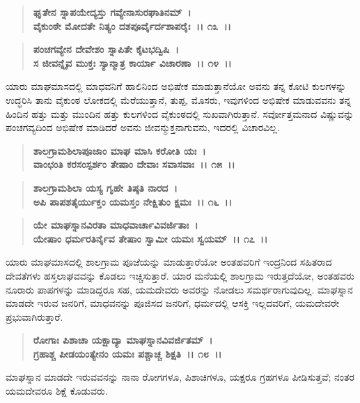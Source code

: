 \begin{verse}
\textbf{ಘೃತೇನ ಸ್ನಾಪಯೇದ್ಯಸ್ತು ಗವ್ಯೇನಾಸುರಘಾತಿನಮ್~।}\\\textbf{ವೈಕುಂಠೇ ಮೋದತೇ ನಿತ್ಯಂ ದಶಪೂರ್ವೈರ್ದಶಾಪರೈಃ~।। ೧೩~।।}
\end{verse}

\begin{verse}
\textbf{ಪಂಚಗವ್ಯೇನ ದೇವೇಶಂ ಸ್ನಾಪಿತೇ ಕೈಟಭದ್ವಿಷಿ~।}\\\textbf{ಸ ಜೀವನ್ನೈವ ಮುಕ್ತಃ ಸ್ಯಾನ್ಮಾತ್ರ ಕಾರ್ಯಾ ವಿಚಾರಣಾ~।। ೧೪~।।}
\end{verse}

ಯಾರು ಮಾಘಮಾಸದಲ್ಲಿ ಮಾಧವನಿಗೆ ಹಾಲಿನಿಂದ ಅಭಿಷೇಕ ಮಾಡುತ್ತಾನೆಯೋ ಅವನು ತನ್ನ ಕೋಟಿ ಕುಲಗಳನ್ನು ಉದ್ಧರಿಸಿ ತಾನು ವೈಕುಂಠ ಲೋಕದಲ್ಲಿ ಮೆರೆಯುತ್ತಾನೆ, ತುಪ್ಪ, ಮೊಸರು, ಇವುಗಳಿಂದ ಅಭಿಷೇಕ ಮಾಡುವವನು ತನ್ನ ಹಿಂದಿನ ಹತ್ತು ಮತ್ತು ಮುಂದಿನ ಹತ್ತು ಕುಲಗಳಿಂದ ವೈಕುಂಠದಲ್ಲಿ ಸುಖವಾಗಿರುತ್ತಾನೆ. ಸರ್ವೋತ್ತಮನಾದ ವಿಷ್ಣುವನ್ನು ಪಂಚಗವ್ಯದಿಂದ ಅಭಿಷೇಕ ಮಾಡಿದರೆ ಅವನು ಜೀವನ್ಮುಕ್ತನಾಗುವನು, ಇದರಲ್ಲಿ ವಿಚಾರವಿಲ್ಲ.

\begin{verse}
\textbf{ಶಾಲಗ್ರಾಮಶಿಲಾಪೂಜಾಂ ಮಾಘ ಮಾಸಿ ಕರೋತಿ ಯಃ~।}\\\textbf{ವಾಂಛಂತಿ ಕರಸಂಸ್ಪರ್ಶಂ ತೇಷಾಂ ದೇವಾಃ ಸವಾಸವಾಃ~।। ೧೫~।। }
\end{verse}

\begin{verse}
\textbf{ಶಾಲಗ್ರಾಮಶಿಲಾ ಯಸ್ಯ ಗೃಹೇ ತಿಷ್ಠತಿ ನಾರದ~।}\\\textbf{ಅಪಿ ಪಾಪಶತೈರ್ಯುಕ್ತಂ ಯಮಸ್ತಂ ನೇಕ್ಷಿತುಂ ಕ್ಷಮಃ~।। ೧೬~।।} 
\end{verse}

\begin{verse}
\textbf{ಯೇ ಮಾಘಸ್ನಾನವಿರತಾ ಮಾಧವಾರ್ಚಾವಿವರ್ಜಿತಾಃ~।}\\\textbf{ಯೇಷಾಂ ಧರ್ಮರತಿರ್ನೈವ ತೇಷಾಂ ಸ್ವಾಮೀ ಯಮಃ ಸ್ವಯಮ್~।। ೧೭~।।}
\end{verse}

ಯಾರು ಮಾಘಮಾಸದಲ್ಲಿ ಶಾಲಗ್ರಾಮ ಪೂಜೆಯನ್ನು ಮಾಡುತ್ತಾರೆಯೋ ಅಂತಹವರಿಗೆ ಇಂದ್ರನಿಂದ ಸಹಿತರಾದ ದೇವತೆಗಳು ಹಸ್ತಲಾಘವವನ್ನು ಕೊಡಲು ಇಚ್ಚಿಸುತ್ತಾರೆ. ಯಾರ ಮನೆಯಲ್ಲಿ ಶಾಲಗ್ರಾಮ ಇರುತ್ತದೆಯೋ, ಅಂತಹವರು ನೂರಾರು ಪಾಪಗಳನ್ನು ಮಾಡಿದ್ದರೂ ಸಹ, ಯಮದೇವರು ಅವರನ್ನು ನೋಡಲು ಸಮರ್ಥರಾಗುವುದಿಲ್ಲ. ಮಾಘ\-ಸ್ನಾನ ಮಾಡದೇ ಇರುವ ಜನರಿಗೆ, ಮಾಧವನನ್ನು ಪೂಜಿಸದ ಜನರಿಗೆ, ಧರ್ಮದಲ್ಲಿ ಆಸಕ್ತಿ ಇಲ್ಲದವರಿಗೆ, ಯಮದೇವರೇ ಪ್ರಭುವಾಗಿರುತ್ತಾರೆ.

\begin{verse}
\textbf{ರೋಗಾಃ ಪಿಶಾಚಾ ಯಕ್ಷಾದ್ಯಾ ಮಾಘಸ್ನಾನವಿವರ್ಜಿತಮ್~।}\\\textbf{ಗ್ರಹಾಶ್ಚ ಪೀಡಯಂತ್ಯೇನಂ ಯಮಃ ಪಶ್ಚಾಚ್ಚ ಶಿಕ್ಷತಿ~।। ೧೮~।।}
\end{verse}

ಮಾಘಸ್ನಾನ ಮಾಡದೇ ಇರುವವನನ್ನು ನಾನಾ ರೋಗಗಳೂ, ಪಿಶಾಚಿಗಳೂ, ಯಕ್ಷರೂ ಗ್ರಹಗಳೂ ಪೀಡಿಸುತ್ತವೆ; ನಂತರ ಯಮದೇವರೂ ಶಿಕ್ಷೆ ಕೊಡುವರು.

